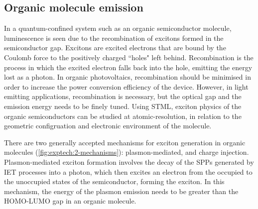 
\begin{figure} [h]
    \centering
    \caption{ }
    \label{fig:exptech:iet-het}
\end{figure}

\subsection{Organic molecule emission}

In a quantum-confined system such as an organic semiconductor molecule, luminescence is seen due to the recombination of excitons formed in the semiconductor gap. Excitons are excited electrons that are bound by the Coulomb force to the positively charged ``holes" left behind. Recombination is the process in which the excited electron falls back into the hole, emitting the energy lost as a photon. In organic photovoltaics, recombination should be minimised in order to increase the power conversion efficiency of the device. However, in light emitting applications, recombination is necessary, but the optical gap and the emission energy needs to be finely tuned. Using \ac{STML}, exciton physics of the organic semiconductors can be studied at atomic-resolution, in relation to the geometric configruation and electronic environment of the molecule.

There are two generally accepted mechanisms for exciton generation in organic molecules (\autoref{fig:exptech:2-mechanisms}): plasmon-mediated, and charge injection. Plasmon-mediated exciton formation involves the decay of the \acp{SPP} generated by \ac{IET} processes into a photon, which then excites an electron from the occupied to the unoccupied states of the semiconductor, forming the exciton. In this mechanism, the energy of the plasmon emission needs to be greater than the \ac{HOMO}-\ac{LUMO} gap in an organic molecule. 

